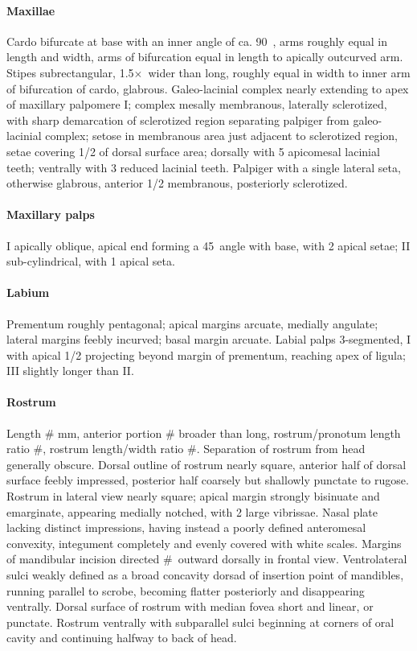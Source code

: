 \documentclass[fleqn,10pt,lineno]{wlpeerj} %
\newcommand{\td}{\textdegree~}
\newcommand{\x}{$\times$~}
\begin{document}
			\paragraph{Maxillae}
				Cardo bifurcate at base with an inner angle of ca. 90\td, arms roughly equal in length and width, arms of bifurcation equal in length to apically outcurved arm. 
				Stipes subrectangular, 1.5\x wider than long, roughly equal in width to inner arm of bifurcation of cardo, glabrous. 
				Galeo-lacinial complex nearly extending to apex of maxillary palpomere I; complex mesally membranous, laterally sclerotized, with sharp demarcation of sclerotized region separating palpiger from galeo-lacinial complex; setose in membranous area just adjacent to sclerotized region, setae covering 1/2 of dorsal surface area; dorsally with 5 apicomesal lacinial teeth; ventrally with 3 reduced lacinial teeth. 
				Palpiger with a single lateral seta, otherwise glabrous, anterior 1/2 membranous, posteriorly sclerotized.
			\paragraph{Maxillary palps}
				I apically oblique, apical end forming a 45\td angle with base, with 2 apical setae; II sub-cylindrical, with 1 apical seta.
			\paragraph{Labium}
				Prementum roughly pentagonal; apical margins arcuate, medially angulate; lateral margins feebly incurved; basal margin arcuate. 
				Labial palps 3-segmented, I with apical 1/2 projecting beyond margin of prementum, reaching apex of ligula; III slightly
longer than II.
			\paragraph{Rostrum}
				Length \# mm, anterior portion \# broader than long, rostrum/pronotum length ratio \#, rostrum length/width ratio \#.
				Separation of rostrum from head generally obscure. 
				Dorsal outline of rostrum nearly square, anterior half of dorsal surface feebly impressed, posterior half coarsely but shallowly punctate to rugose. 
				Rostrum in lateral view nearly square; apical margin strongly bisinuate and emarginate, appearing medially notched, with 2 large vibrissae. 
				Nasal plate lacking distinct impressions, having instead a poorly defined anteromesal convexity, integument completely and evenly covered with white scales. 
				Margins of mandibular incision directed \#\td outward dorsally in frontal view. 
				Ventrolateral sulci weakly defined as a broad concavity dorsad of insertion point of mandibles, running parallel to scrobe, becoming flatter posteriorly and disappearing ventrally.
				Dorsal surface of rostrum with median fovea short and linear, or punctate.
				Rostrum ventrally with subparallel sulci beginning at corners of oral cavity and continuing halfway to back of head.
\end{document}
